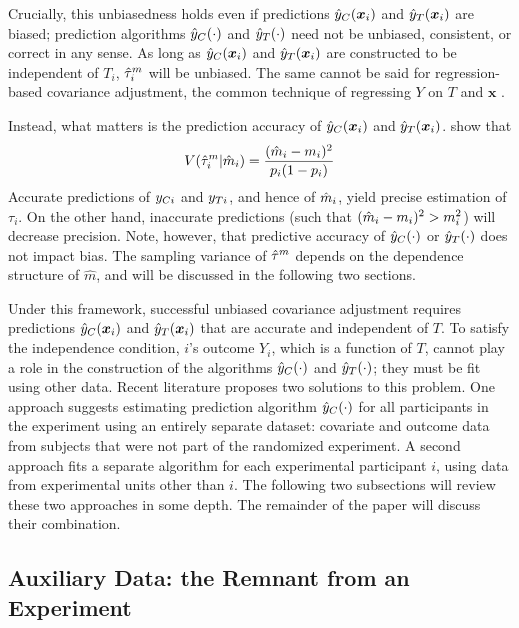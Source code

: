 Crucially, this unbiasedness holds even if predictions $\hat{y}_C(\bm{x}_i)$ and $\hat{y}_T(\bm{x}_i)$ are biased; prediction algorithms $\hat{y}_C(\cdot)$ and $\hat{y}_T(\cdot)$ need not be unbiased, consistent, or correct in any sense.
As long as $\hat{y}_C(\bm{x}_i)$ and $\hat{y}_T(\bm{x}_i)$ are constructed to be independent
of $T_i$, $\hat{\tau}_i^m$ will be unbiased.
The same cannot be said for regression-based covariance
adjustment, the common technique of regressing $Y$ on $T$ and $\bm{x}$
\citep{freedman2008regression}.

Instead, what matters is the prediction
accuracy of $\hat{y}_C(\bm{x}_i)$ and $\hat{y}_T(\bm{x}_i)$.
\citet{loop} show that
\begin{equation}
V(\hat{\tau}_i^m|\hat{m}_i)=\frac{(\hat{m}_i-m_i)^2}{p_i(1-p_i)}
\end{equation}
Accurate predictions of $y_{Ci}$ and $y_{Ti}$, and hence of $\hat{m}_i$, yield precise estimation of $\tau_i$.
On the other hand, inaccurate predictions (such that
$(\hat{m}_i-m_i)^2>m_i^2$) will decrease precision.
Note, however, that predictive accuracy of $\hat{y}_C(\cdot)$ or $\hat{y}_T(\cdot)$ does not impact bias.
The sampling variance of $\hat{\tau}^m$ depends on the dependence structure of
$\hat{m}$, and will be discussed in the following two sections.

Under this framework, successful unbiased covariance adjustment
requires predictions $\hat{y}_C(\bm{x}_i) $ and $\hat{y}_T(\bm{x}_i) $ that are accurate and
independent of $T$.
To satisfy the independence condition, $i$'s outcome $Y_i$, which is a
function of $T$, cannot play a role in the construction of the algorithms $\hat{y}_C(\cdot)$ and
$\hat{y}_T(\cdot)$; they must be fit using other data.
Recent literature proposes two solutions to this problem.
 One approach \citep{rebarEDM} suggests
estimating prediction algorithm $\hat{y}_C(\cdot) $ for all participants in the
experiment using an entirely separate dataset: covariate and outcome data from subjects
that were not part of the randomized experiment.
A second approach \citep{loop} fits a separate algorithm for each
experimental participant $i$, using data from experimental units other
than $i$.
The following two subsections will review these two approaches in some
depth.
The remainder of the paper will discuss their combination.

\subsection{Auxiliary Data: the Remnant from an Experiment}

